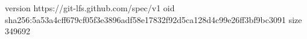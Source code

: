version https://git-lfs.github.com/spec/v1
oid sha256:5a53a4cff679cf05f3e3896adf58e17832f92d5ca128d4c99e26ff3bf9bc3091
size 349692
